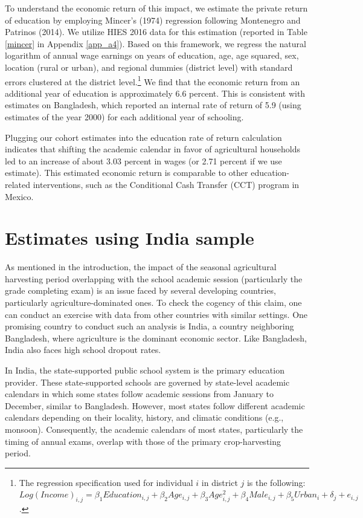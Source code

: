 \documentclass[12pt,letterpaper]{article}
\newcommand{\0}{\ensuremath{\mbox{\boldmath $0$}}}
\begin{document}
To understand the economic return of this impact, we estimate the private return of education by employing Mincer's (1974) regression following Montenegro and Patrinos (2014). We utilize HIES 2016 data for this estimation (reported in Table \ref{mincer} in Appendix \ref{app_a4}). Based on this framework, we regress the natural logarithm of annual wage earnings on years of education, age, age squared, sex, location (rural or urban), and regional dummies (district level) with standard errors clustered at the district level.\footnote{The regression specification used for individual $i$ in district $j$ is the following: $Log(Income)_{i,j}=\beta_{1}Education_{i,j}+\beta_{2}Age_{i,j}+\beta_{3}Age^{2}_{i,j}+\beta_{4}Male_{i,j}+\beta_{5}Urban_{i}+\delta_{j}+e_{i,j}$.}
We find that the economic return from an additional year of education is approximately 6.6 percent. This is consistent with \cite{montenegro2014comparable} estimates on Bangladesh, which reported an internal rate of return of 5.9 (using estimates of the year 2000) for each additional year of schooling. 

Plugging our cohort estimates into the education rate of return calculation indicates that shifting the academic calendar in favor of agricultural households led to an increase of about 3.03 percent in wages (or 2.71 percent if we use \cite{montenegro2014comparable} estimate). This estimated economic return is comparable to other education-related interventions, such as the Conditional Cash Transfer (CCT) program in Mexico.


\section{Estimates using India sample}

As mentioned in the introduction, the impact of the seasonal agricultural harvesting period overlapping with the school academic session (particularly the grade completing exam) is an issue faced by several developing countries, particularly agriculture-dominated ones. To check the cogency of this claim, one can conduct an exercise with data from other countries with similar settings. One promising country to conduct such an analysis is India, a country neighboring Bangladesh, where agriculture is the dominant economic sector. Like Bangladesh, India also faces high school dropout rates.

In India, the state-supported public school system is the primary education provider. These state-supported schools are governed by state-level academic calendars in which some states follow academic sessions from January to December, similar to Bangladesh. However, most states follow different academic calendars depending on their locality, history, and climatic conditions (e.g., monsoon). Consequently, the academic calendars of most states, particularly the timing of annual exams, overlap with those of the primary crop-harvesting period. 
\end{document}
